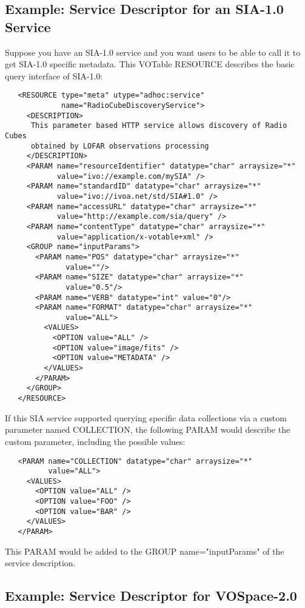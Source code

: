 \documentclass[11pt,a4paper]{ivoa}
\newcommand{\attval}[2]{#1={\allowbreak}{"}#2{"}}
\begin{document}
\subsection{Example: Service Descriptor for an SIA-1.0 Service}

Suppose you have an SIA-1.0 service and you want users to be able to
call it to get SIA-1.0 specific metadata. This VOTable RESOURCE describes
the basic query interface of SIA-1.0:
\begin{verbatim}
   <RESOURCE type="meta" utype="adhoc:service" 
             name="RadioCubeDiscoveryService">
     <DESCRIPTION> 
      This parameter based HTTP service allows discovery of Radio Cubes 
      obtained by LOFAR observations processing 
     </DESCRIPTION>
     <PARAM name="resourceIdentifier" datatype="char" arraysize="*"
            value="ivo://example.com/mySIA" />
     <PARAM name="standardID" datatype="char" arraysize="*"
            value="ivo://ivoa.net/std/SIA#1.0" />
     <PARAM name="accessURL" datatype="char" arraysize="*"
            value="http://example.com/sia/query" />
     <PARAM name="contentType" datatype="char" arraysize="*" 
            value="application/x-votable+xml" />
     <GROUP name="inputParams">
       <PARAM name="POS" datatype="char" arraysize="*"
              value=""/>
       <PARAM name="SIZE" datatype="char" arraysize="*"
              value="0.5"/>
       <PARAM name="VERB" datatype="int" value="0"/>
       <PARAM name="FORMAT" datatype="char" arraysize="*"
              value="ALL">
         <VALUES>
           <OPTION value="ALL" />
           <OPTION value="image/fits" />
           <OPTION value="METADATA" />
         </VALUES>
       </PARAM>
     </GROUP>
   </RESOURCE>
\end{verbatim}

If this SIA service supported querying specific data collections via
a custom parameter named COLLECTION, the following PARAM would describe the
custom parameter, including the possible values:
\begin{verbatim}
   <PARAM name="COLLECTION" datatype="char" arraysize="*"
          value="ALL">
     <VALUES>
       <OPTION value="ALL" />
       <OPTION value="FOO" />
       <OPTION value="BAR" />
     </VALUES>
   </PARAM>
\end{verbatim}
This PARAM would be added to the GROUP \attval{name}{inputParams}
of the service description.


\subsection{Example: Service Descriptor for VOSpace-2.0}
\end{document}
